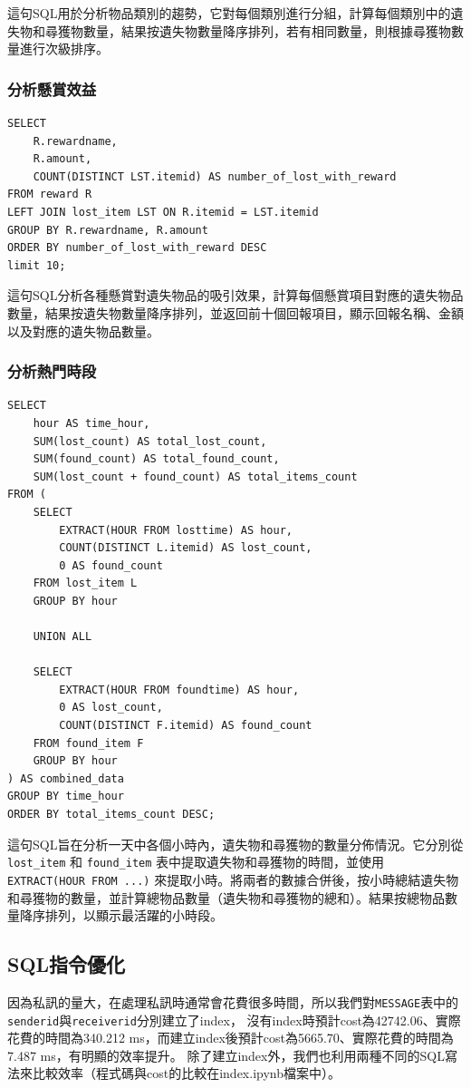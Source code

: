 \documentclass[12pt,a4paper]{article}
\begin{document}
這句SQL用於分析物品類別的趨勢，它對每個類別進行分組，計算每個類別中的遺失物和尋獲物數量，結果按遺失物數量降序排列，若有相同數量，則根據尋獲物數量進行次級排序。

\subsubsection{分析懸賞效益}
\begin{lstlisting}
SELECT 
    R.rewardname,
    R.amount,
    COUNT(DISTINCT LST.itemid) AS number_of_lost_with_reward
FROM reward R
LEFT JOIN lost_item LST ON R.itemid = LST.itemid
GROUP BY R.rewardname, R.amount
ORDER BY number_of_lost_with_reward DESC
limit 10;
\end{lstlisting}

這句SQL分析各種懸賞對遺失物品的吸引效果，計算每個懸賞項目對應的遺失物品數量，結果按遺失物數量降序排列，並返回前十個回報項目，顯示回報名稱、金額以及對應的遺失物品數量。

\subsubsection{分析熱門時段}
\begin{lstlisting}
SELECT 
    hour AS time_hour,
    SUM(lost_count) AS total_lost_count,
    SUM(found_count) AS total_found_count,
    SUM(lost_count + found_count) AS total_items_count
FROM (
    SELECT 
        EXTRACT(HOUR FROM losttime) AS hour,
        COUNT(DISTINCT L.itemid) AS lost_count,
        0 AS found_count
    FROM lost_item L
    GROUP BY hour

    UNION ALL

    SELECT 
        EXTRACT(HOUR FROM foundtime) AS hour,
        0 AS lost_count,
        COUNT(DISTINCT F.itemid) AS found_count
    FROM found_item F
    GROUP BY hour
) AS combined_data
GROUP BY time_hour
ORDER BY total_items_count DESC;
\end{lstlisting}

這句SQL旨在分析一天中各個小時內，遺失物和尋獲物的數量分佈情況。它分別從 \texttt{lost\_item} 和 \texttt{found\_item} 表中提取遺失物和尋獲物的時間，並使用 \texttt{EXTRACT(HOUR FROM ...)} 來提取小時。將兩者的數據合併後，按小時總結遺失物和尋獲物的數量，並計算總物品數量（遺失物和尋獲物的總和）。結果按總物品數量降序排列，以顯示最活躍的小時段。

\subsection{SQL指令優化}
因為私訊的量大，在處理私訊時通常會花費很多時間，所以我們對\texttt{MESSAGE}表中的\texttt{senderid}與\texttt{receiverid}分別建立了index，
沒有index時預計cost為42742.06、實際花費的時間為340.212 ms，而建立index後預計cost為5665.70、實際花費的時間為7.487 ms，有明顯的效率提升。
除了建立index外，我們也利用兩種不同的SQL寫法來比較效率（程式碼與cost的比較在index.ipynb檔案中）。
\end{document}
